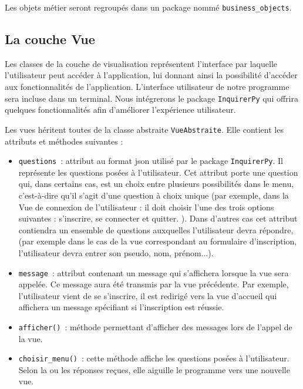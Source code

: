 \documentclass[11pt]{article}
\begin{document}
\bigbreak

Les objets métier seront regroupés dans un package nommé \texttt{business\_objects}.

\subsection{La couche Vue}

Les classes de la couche de visualisation représentent l'interface par laquelle l'utilisateur peut accéder à l'application, lui donnant ainsi la possibilité d'accéder aux fonctionnalités de l'application. L'interface utilisateur de notre programme sera incluse dans un terminal. Nous intégrerons le package \texttt{InquirerPy} qui offrira quelques fonctionnalités afin d'améliorer l'expérience utilisateur.
\bigbreak

Les vues héritent toutes de la classe abstraite \texttt{VueAbstraite}. Elle contient les attributs et méthodes suivantes :
\begin{itemize}
    \item \texttt{questions}~: attribut au format json utilisé par le package \texttt{InquirerPy}. Il représente les questions posées à l'utilisateur. Cet attribut porte une question qui, dans certains cas, est un choix entre plusieurs possibilités dans le menu, c'est-à-dire qu'il s'agit d'une question à choix unique (par exemple, dans la Vue de connexion de l'utilisateur : il doit choisir l'une des trois options suivantes : s'inscrire, se connecter et quitter. ). Dans d'autres cas cet attribut contiendra un ensemble de questions auxquelles l'utilisateur devra répondre,  (par exemple dans le cas de la vue correspondant au formulaire d'inscription, l'utilisateur devra entrer son pseudo, nom, prénom...).
    \item \texttt{message}~: attribut contenant un message qui s'affichera lorsque la vue sera appelée. Ce message aura été transmis par la vue précédente. Par exemple, l'utilisateur vient de se s'inscrire, il est redirigé vers la vue d'accueil qui affichera un message spécifiant si l'inscription est réussie.
    \item \texttt{afficher()}~: méthode permettant d'afficher des messages lors de l'appel de la vue.
    \item \texttt{choisir\_menu()}~: cette méthode affiche les questions posées à l'utilisateur. Selon la ou les réponses reçues, elle aiguille le programme vers une nouvelle vue.
\end{itemize}
\end{document}
